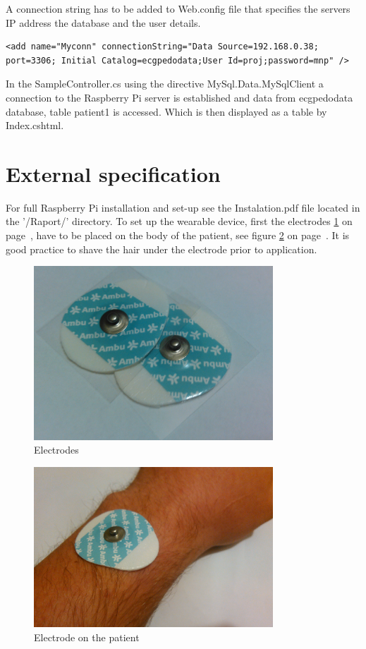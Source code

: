 \documentclass[12pt,]{article}
\numberwithin{figure}{section}
\begin{document}
A connection string has to be added to Web.config file that specifies the servers IP address the database and the user details.
\begin{verbatim}
<add name="Myconn" connectionString="Data Source=192.168.0.38;
port=3306; Initial Catalog=ecgpedodata;User Id=proj;password=mnp" />
\end{verbatim}
In the SampleController.cs using the directive MySql.Data.MySqlClient a connection to the Raspberry Pi server is established and data from ecgpedodata database, table patient1 is accessed. Which is then displayed as a table by Index.cshtml.
\newpage
\section{External specification}
For full Raspberry Pi installation and set-up see the Instalation.pdf file located in the '/Raport/' directory. To set up the wearable device, first the electrodes \ref{fig:22} on page~\pageref{fig:22}, have to be placed on the body of the patient, see figure \ref{fig:36} on page~\pageref{fig:36}. It is good practice to shave the hair under the electrode prior to application.
\begin{figure}[H]
	\begin{center}
		\includegraphics[width=0.8\textwidth]{21}
	\end{center}
    \caption{Electrodes}
	\label{fig:22}
\end{figure}
\begin{figure}[H]
	\begin{center}
		\includegraphics[width=0.8\textwidth]{22}
	\end{center}
    \caption{Electrode on the patient}
	\label{fig:36}
\end{figure}
\end{document}
